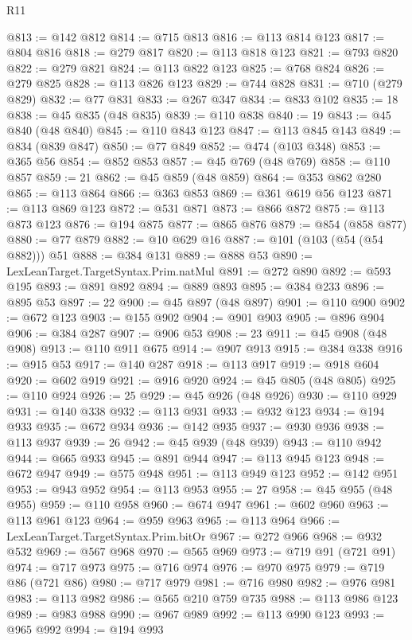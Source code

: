 \begin{lexlean}{R11}
\begin{coremodule}
@813 := @142 @812
@814 := @715 @813
@816 := @113 @814 @123
@817 := @804 @816
@818 := @279 @817
@820 := @113 @818 @123
@821 := @793 @820
@822 := @279 @821
@824 := @113 @822 @123
@825 := @768 @824
@826 := @279 @825
@828 := @113 @826 @123
@829 := @744 @828
@831 := @710 (@279 @829)
@832 := @77 @831
@833 := @267 @347
@834 := @833 @102
@835 := 18
@838 := @45 @835 (@48 @835)
@839 := @110 @838
@840 := 19
@843 := @45 @840 (@48 @840)
@845 := @110 @843 @123
@847 := @113 @845 @143
@849 := @834 (@839 @847)
@850 := @77 @849
@852 := @474 (@103 @348)
@853 := @365 @56
@854 := @852 @853
@857 := @45 @769 (@48 @769)
@858 := @110 @857
@859 := 21
@862 := @45 @859 (@48 @859)
@864 := @353 @862 @280
@865 := @113 @864
@866 := @363 @853
@869 := @361 @619 @56 @123
@871 := @113 @869 @123
@872 := @531 @871
@873 := @866 @872
@875 := @113 @873 @123
@876 := @194 @875
@877 := @865 @876
@879 := @854 (@858 @877)
@880 := @77 @879
@882 := @10 @629 @16
@887 := @101 (@103 (@54 (@54 @882))) @51
@888 := @384 @131
@889 := @888 @53
@890 := LexLeanTarget.TargetSyntax.Prim.natMul
@891 := @272 @890
@892 := @593 @195
@893 := @891 @892
@894 := @889 @893
@895 := @384 @233
@896 := @895 @53
@897 := 22
@900 := @45 @897 (@48 @897)
@901 := @110 @900
@902 := @672 @123
@903 := @155 @902
@904 := @901 @903
@905 := @896 @904
@906 := @384 @287
@907 := @906 @53
@908 := 23
@911 := @45 @908 (@48 @908)
@913 := @110 @911 @675
@914 := @907 @913
@915 := @384 @338
@916 := @915 @53
@917 := @140 @287
@918 := @113 @917
@919 := @918 @604
@920 := @602 @919
@921 := @916 @920
@924 := @45 @805 (@48 @805)
@925 := @110 @924
@926 := 25
@929 := @45 @926 (@48 @926)
@930 := @110 @929
@931 := @140 @338
@932 := @113 @931
@933 := @932 @123
@934 := @194 @933
@935 := @672 @934
@936 := @142 @935
@937 := @930 @936
@938 := @113 @937
@939 := 26
@942 := @45 @939 (@48 @939)
@943 := @110 @942
@944 := @665 @933
@945 := @891 @944
@947 := @113 @945 @123
@948 := @672 @947
@949 := @575 @948
@951 := @113 @949 @123
@952 := @142 @951
@953 := @943 @952
@954 := @113 @953
@955 := 27
@958 := @45 @955 (@48 @955)
@959 := @110 @958
@960 := @674 @947
@961 := @602 @960
@963 := @113 @961 @123
@964 := @959 @963
@965 := @113 @964
@966 := LexLeanTarget.TargetSyntax.Prim.bitOr
@967 := @272 @966
@968 := @932 @532
@969 := @567 @968
@970 := @565 @969
@973 := @719 @91 (@721 @91)
@974 := @717 @973
@975 := @716 @974
@976 := @970 @975
@979 := @719 @86 (@721 @86)
@980 := @717 @979
@981 := @716 @980
@982 := @976 @981
@983 := @113 @982
@986 := @565 @210 @759 @735
@988 := @113 @986 @123
@989 := @983 @988
@990 := @967 @989
@992 := @113 @990 @123
@993 := @965 @992
@994 := @194 @993

\end{coremodule}
\end{lexlean}
